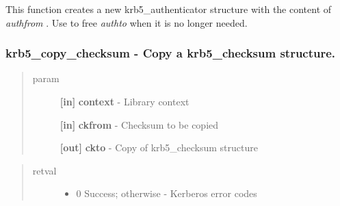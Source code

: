 \documentclass[letterpaper,10pt,english]{sphinxmanual}
\begin{document}
This function creates a new krb5\_authenticator structure with the content of \emph{authfrom} . Use {\hyperref[appdev/refs/api/krb5_free_authenticator:krb5_free_authenticator]{}} to free \emph{authto} when it is no longer needed.


\subsubsection{krb5\_copy\_checksum -  Copy a krb5\_checksum structure.}
\label{appdev/refs/api/krb5_copy_checksum:krb5-copy-checksum-copy-a-krb5-checksum-structure}\label{appdev/refs/api/krb5_copy_checksum::doc}

\begin{fulllineitems}
\label{appdev/refs/api/krb5_copy_checksum:krb5_copy_checksum}
\end{fulllineitems}

\begin{quote}\begin{description}
\item[{param}] \leavevmode
\textbf{{[}in{]}} \textbf{context} - Library context

\textbf{{[}in{]}} \textbf{ckfrom} - Checksum to be copied

\textbf{{[}out{]}} \textbf{ckto} - Copy of krb5\_checksum structure

\end{description}\end{quote}
\begin{quote}\begin{description}
\item[{retval}] \leavevmode\begin{itemize}
\item {} 
0   Success; otherwise - Kerberos error codes

\end{itemize}

\end{description}\end{quote}
\end{document}

